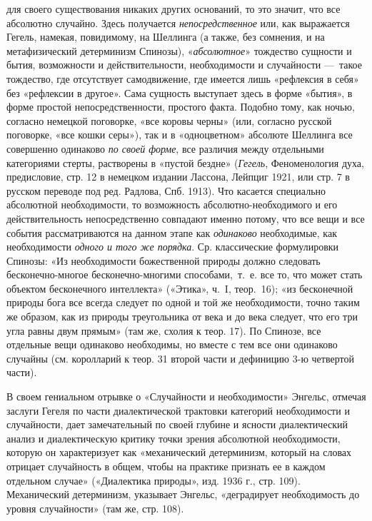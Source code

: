\begin{enumerate}
для своего существования никаких других оснований, то это значит, что все
абсолютно случайно. Здесь получается {\em непосредственное} или, как
выражается Гегель, намекая, повидимому, на Шеллинга (а также, без сомнения,
и на метафизический детерминизм Спинозы), «{\em абсолютное}» тождество
сущности и бытия, возможности и действительности, необходимости и
случайности —~такое тождество, где отсутствует самодвижение, где имеется
лишь «рефлексия в себя» без «рефлексии в другое». Сама сущность выступает
здесь в форме «бытия», в форме простой непосредственности, простого факта.
Подобно тому, как ночью, согласно немецкой поговорке, «все коровы черны»
(или, согласно русской поговорке, «все кошки серы»), так и в «одноцветном»
абсолюте Шеллинга все совершенно одинаково {\em по своей форме}, все
различия между отдельными категориями стерты, растворены в «пустой бездне»
({\em Гегель}, Феноменология духа, предисловие, стр. 12 в немецком
издании Лассона, Лейпциг 1921, или стр. 7 в русском переводе под ред.
Радлова, Спб. 1913). Что касается специально абсолютной необходимости, то
возможность абсолютно-необходимого и его действительность непосредственно
совпадают именно потому, что все вещи и все события рассматриваются на
данном этапе как {\em одинаково} необходимые, как необходимости
{\em одного и того же порядка}. Ср. классические формулировки Спинозы:
«Из необходимости божественной природы должно следовать бесконечно-многое
бесконечно-многими способами,~т.~е. все то, что может стать объектом
бесконечного интеллекта» («Этика», ч.~I, теор.~16); «из бесконечной природы
бога все всегда следует по одной и той же необходимости, точно таким же
образом, как из природы треугольника от века и до века следует, что его три
угла равны двум прямым» (там же, схолия к теор. 17). По Спинозе, все
отдельные вещи одинаково необходимы, но вместе с тем все они одинаково
случайны (см. королларий к теор. 31 второй части и дефиницию 3-ю четвертой
части).
\end{enumerate}
В своем гениальном отрывке о «Случайности и необходимости» Энгельс, отмечая
заслуги Гегеля по части диалектической трактовки категорий необходимости и
случайности, дает замечательный по своей глубине и ясности диалектический
анализ и диалектическую критику точки зрения абсолютной необходимости,
которую он характеризует как «механический детерминизм, который на словах
отрицает случайность в общем, чтобы на практике признать ее в каждом
отдельном случае» («Диалектика природы», изд. 1936 г., стр. 109).
Механический детерминизм, указывает Энгельс, «деградирует необходимость до
уровня случайности» (там же, стр. 108).

